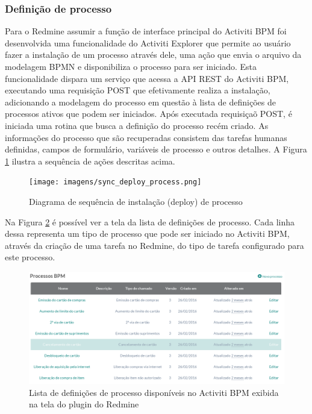 \subsubsection{Definição de processo}\label{sec:integracao_redmine_activiti_sincronizacao-deploy_processo}

Para o Redmine assumir a função de interface principal do Activiti BPM foi desenvolvida uma funcionalidade do Activiti Explorer que permite ao usuário fazer a instalação de um processo através dele, uma ação que envia o arquivo da modelagem BPMN e disponibiliza o processo para ser iniciado. Esta funcionalidade dispara um serviço que acessa a API REST do Activiti BPM, executando uma requisição POST que efetivamente realiza a instalação, adicionando a modelagem do processo em questão à lista de definições de processos ativos que podem ser iniciados. 
Após executada requisiçaõ POST, é iniciada uma rotina que busca a definição do processo recém criado. As informações do processo que são recuperadas consistem das tarefas humanas definidas, campos de formulário, variáveis de processo e outros detalhes.
A Figura \ref{fig:sync_deploy_process} ilustra a sequência de ações descritas acima.

\begin{figure}[H]
\centering
\texttt{[image: imagens/sync\_deploy\_process.png]}
\caption{Diagrama de sequência de instalação (deploy) de processo}
\label{fig:sync_deploy_process}
\end{figure}

Na Figura \ref{fig:process_list} é possível ver a tela da lista de definições de processo. Cada linha dessa representa um tipo de processo que pode ser iniciado no Activiti BPM, através da criação de uma tarefa no Redmine, do tipo de tarefa configurado para este processo.

\begin{figure}[H]
\centering
\includegraphics[width=1\textwidth]{imagens/plugin_process_list.png}
\caption{Lista de definições de processo disponíveis no Activiti BPM exibida na tela do plugin do Redmine}
\label{fig:process_list}
\end{figure}

